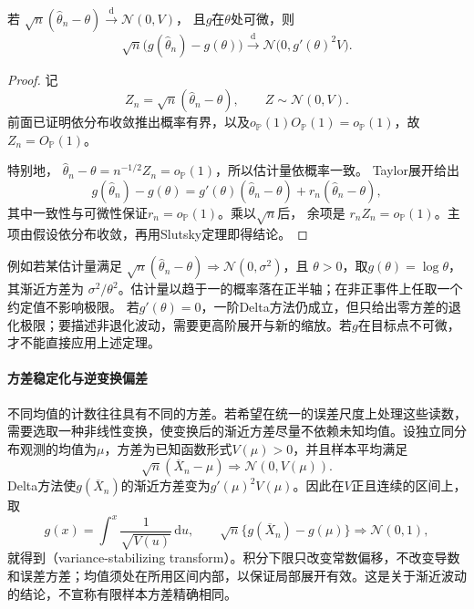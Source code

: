 \begin{theorem}[Delta方法]
\label{thm:statistics-delta-method}
若
\(\sqrt n(\widehat\theta_n-\theta)\xrightarrow{\mathrm d}\mathcal N(0,V)\)，
且\(g\)在\(\theta\)处可微，则
\[
  \sqrt n\bigl(g(\widehat\theta_n)-g(\theta)\bigr)
  \xrightarrow{\mathrm d}
  \mathcal N\bigl(0,g'(\theta)^2V\bigr).
\]
\end{theorem}

\begin{proof}
记
\[
  Z_n=\sqrt n(\widehat\theta_n-\theta),
  \qquad
  Z\sim\mathcal N(0,V).
\]
前面已证明依分布收敛推出概率有界，以及\(o_{\mathbb P}(1)O_{\mathbb P}(1)=o_{\mathbb P}(1)\)，故\(Z_n=O_{\mathbb P}(1)\)。

特别地，
\(\widehat\theta_n-\theta=n^{-1/2}Z_n=o_{\mathbb{P}}(1)\)，所以估计量依概率一致。
Taylor展开给出
\[
  g(\widehat\theta_n)-g(\theta)
  =g'(\theta)(\widehat\theta_n-\theta)
   +r_n(\widehat\theta_n-\theta),
\]
其中一致性与可微性保证\(r_n=o_{\mathbb{P}}(1)\)。乘以\(\sqrt n\)后，
余项是
\(r_nZ_n=o_{\mathbb{P}}(1)\)。主项由假设依分布收敛，再用Slutsky定理即得结论。
\end{proof}

例如若某估计量满足
\(\sqrt n(\widehat\theta_n-\theta)\Rightarrow\mathcal N(0,\sigma^2)\)，且
\(\theta>0\)，取\(g(\theta)=\log\theta\)，其渐近方差为
\(\sigma^2/\theta^2\)。估计量以趋于一的概率落在正半轴；在非正事件上任取一个约定值不影响极限。
若\(g'(\theta)=0\)，一阶Delta方法仍成立，但只给出零方差的退化极限；要描述非退化波动，需要更高阶展开与新的缩放。若\(g\)在目标点不可微，才不能直接应用上述定理。

\paragraph{方差稳定化与逆变换偏差}
不同均值的计数往往具有不同的方差。若希望在统一的误差尺度上处理这些读数，需要选取一种非线性变换，使变换后的渐近方差尽量不依赖未知均值。设独立同分布观测的均值为\(\mu\)，方差为已知函数形式\(V(\mu)>0\)，并且样本平均满足
\[
 \sqrt n(\overline X_n-\mu)\Rightarrow\mathcal N(0,V(\mu)).
\]
Delta方法使\(g(\overline X_n)\)的渐近方差变为\(g'(\mu)^2V(\mu)\)。因此在\(V\)正且连续的区间上，取
\begin{equation}
 g(x)=\int^x\frac{1}{\sqrt{V(u)}}\,\mathrm du,
 \qquad
 \sqrt n\{g(\overline X_n)-g(\mu)\}
 \Rightarrow\mathcal N(0,1),
 \label{eq:stoch-variance-stabilizing-delta}
\end{equation}
就得到（variance-stabilizing transform）。积分下限只改变常数偏移，不改变导数和误差方差；均值须处在所用区间内部，以保证局部展开有效。这是关于渐近波动的结论，不宣称有限样本方差精确相同。

